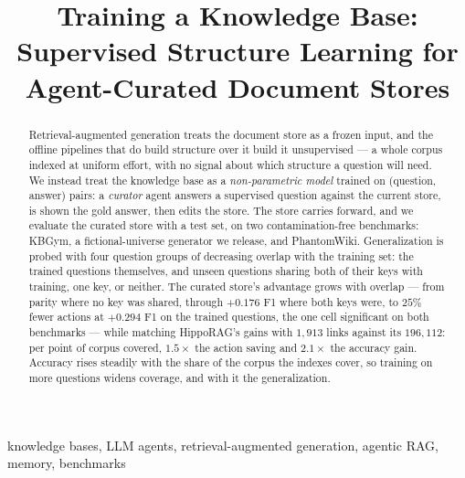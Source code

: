 \documentclass[conference]{IEEEtran}
\begin{document}
\title{Training a Knowledge Base:\\Supervised Structure Learning for Agent-Curated Document Stores}

\author{
\and
{}
}

\maketitle

\begin{abstract}
Retrieval-augmented generation treats the document store as a frozen input,
and the offline pipelines that do build structure over it build it
unsupervised --- a whole corpus indexed at uniform effort, with no signal
about which structure a question will need. We instead treat the knowledge
base as a \emph{non-parametric model} trained on (question, answer) pairs: a
\emph{curator} agent answers a supervised question against the current
store, is shown the gold answer, then edits the store. The store carries
forward, and we evaluate the curated store with a test set, on two
contamination-free benchmarks: KBGym, a fictional-universe generator we
release, and PhantomWiki. Generalization is probed with four question groups
of decreasing overlap with the training set: the trained questions
themselves, and unseen questions sharing both of their keys with training,
one key, or neither. The curated store's advantage grows with overlap ---
from parity where no key was shared, through $+0.176$ F1 where both keys
were, to $25\%$ fewer actions at $+0.294$ F1 on the trained questions, the
one cell significant on both benchmarks --- while matching HippoRAG's gains
with $1{,}913$ links against its $196{,}112$: per point of corpus covered,
$1.5\times$ the action saving and $2.1\times$ the accuracy gain. Accuracy
rises steadily with the share of the corpus the indexes cover, so training
on more questions widens coverage, and with it the generalization.
\end{abstract}

\begin{IEEEkeywords}
knowledge bases, LLM agents, retrieval-augmented generation, agentic RAG, memory, benchmarks
\end{IEEEkeywords}
\end{document}
